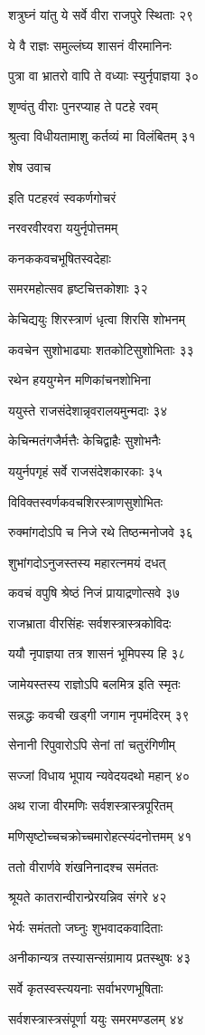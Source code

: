 शत्रुघ्नं यांतु ये सर्वे वीरा राजपुरे स्थिताः २९

ये वै राज्ञः समुल्लंघ्य शासनं वीरमानिनः

पुत्रा वा भ्रातरो वापि ते वध्याः स्युर्नृपाज्ञया ३०

शृण्वंतु वीराः पुनरप्याह ते पटहे रवम्

श्रुत्वा विधीयतामाशु कर्तव्यं मा विलंबितम् ३१

शेष उवाच

इति पटहरवं स्वकर्णगोचरं

नरवरवीरवरा ययुर्नृपोत्तमम्

कनककवचभूषितस्वदेहाः

समरमहोत्सव हृष्टचित्तकोशाः ३२

केचिद्ययुः शिरस्त्राणं धृत्वा शिरसि शोभनम्

कवचेन सुशोभाढ्याः शतकोटिसुशोभिताः ३३

रथेन हययुग्मेन मणिकांचनशोभिना

ययुस्ते राजसंदेशान्नृवरालयमुन्मदाः ३४

केचिन्मतंगजैर्मत्तैः केचिद्वाहैः सुशोभनैः

ययुर्नपगृहं सर्वे राजसंदेशकारकाः ३५

विविक्तस्वर्णकवचशिरस्त्राणसुशोभितः

रुक्मांगदोऽपि च निजे रथे तिष्ठन्मनोजवे ३६

शुभांगदोऽनुजस्तस्य महारत्नमयं दधत्

कवचं वपुषि श्रेष्ठं निजं प्रायाद्रणोत्सवे ३७

राजभ्राता वीरसिंहः सर्वशस्त्रास्त्रकोविदः

ययौ नृपाज्ञया तत्र शासनं भूमिपस्य हि ३८

जामेयस्तस्य राज्ञोऽपि बलमित्र इति स्मृतः

सन्नद्धः कवची खड्गी जगाम नृपमंदिरम् ३९

सेनानी रिपुवारोऽपि सेनां तां चतुरंगिणीम्

सज्जां विधाय भूपाय न्यवेदयदथो महान् ४०

अथ राजा वीरमणिः सर्वशस्त्रास्त्रपूरितम्

मणिसृष्टोच्चचक्रोच्चमारोहत्स्यंदनोत्तमम् ४१

ततो वीरार्णवे शंखनिनादश्च समंततः

श्रूयते कातरान्वीरान्प्रेरयन्निव संगरे ४२

भेर्यः समंततो जघ्नुः शुभवादकवादिताः

अनीकान्यत्र तस्यासन्संग्रामाय प्रतस्थुषः ४३

सर्वे कृतस्वस्त्ययनाः सर्वाभरणभूषिताः

सर्वशस्त्रास्त्रसंपूर्णा ययुः समरमण्डलम् ४४

